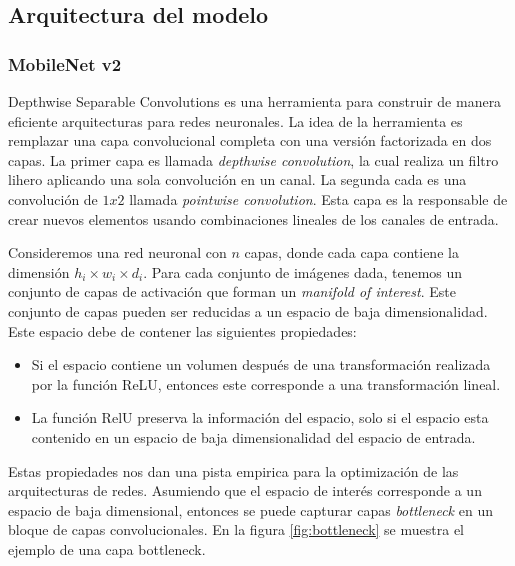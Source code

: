 \subsection{Arquitectura del modelo}

\subsubsection{MobileNet v2}


Depthwise Separable Convolutions es una herramienta para construir de manera eficiente arquitecturas para redes neuronales\cite{Howard_2017,Chollet_2016,Zhang_2017}. La idea de la herramienta es remplazar una capa convolucional completa con una versión factorizada en dos capas. La primer capa es llamada \textit{depthwise convolution}, la cual realiza un filtro lihero aplicando una sola convolución en un canal. La segunda cada es una convolución de $1x2$ llamada \textit{pointwise convolution}. Esta capa es la responsable de crear nuevos elementos usando combinaciones lineales de los canales de entrada.



Consideremos una red neuronal con $n$ capas, donde cada capa contiene la dimensión $h_i \times w_i \times d_i$. Para cada conjunto de imágenes dada, tenemos un conjunto de capas de activación que forman un \textit{manifold of interest}. Este conjunto de capas pueden ser reducidas a un espacio de baja dimensionalidad. Este espacio debe de contener las siguientes propiedades:

\begin{itemize}
    \item Si el espacio contiene un volumen después de una transformación realizada por la función ReLU, entonces este corresponde a una transformación lineal.
    \item La función RelU preserva la información del espacio, solo si el espacio esta contenido en un espacio de baja dimensionalidad del espacio de entrada.
\end{itemize}

Estas propiedades nos dan una pista empirica para la optimización de las arquitecturas de redes. Asumiendo que el espacio de interés corresponde a un espacio de baja dimensional, entonces se puede capturar capas \textit{bottleneck} en un bloque de capas convolucionales. En la figura \ref{fig:bottleneck} se muestra el ejemplo de una capa bottleneck.


